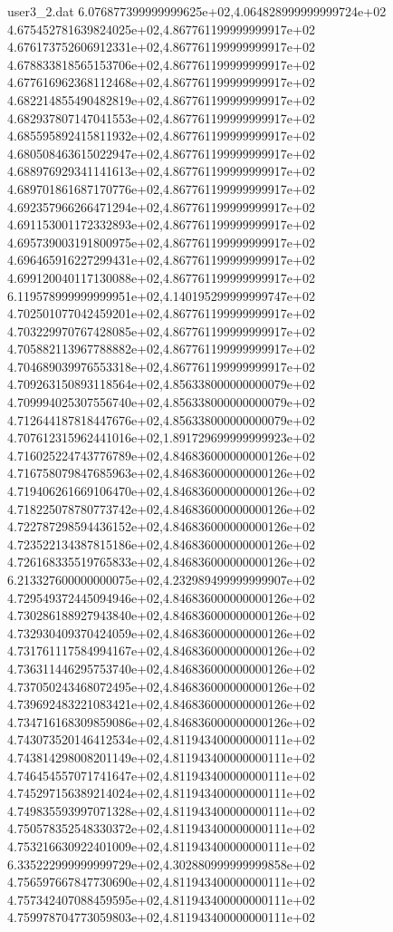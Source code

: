 \begin{filecontents}{user3_2.dat}
6.076877399999999625e+02,4.064828999999999724e+02
4.675452781639824025e+02,4.867761199999999917e+02
4.676173752606912331e+02,4.867761199999999917e+02
4.678833818565153706e+02,4.867761199999999917e+02
4.677616962368112468e+02,4.867761199999999917e+02
4.682214855490482819e+02,4.867761199999999917e+02
4.682937807147041553e+02,4.867761199999999917e+02
4.685595892415811932e+02,4.867761199999999917e+02
4.680508463615022947e+02,4.867761199999999917e+02
4.688976929341141613e+02,4.867761199999999917e+02
4.689701861687170776e+02,4.867761199999999917e+02
4.692357966266471294e+02,4.867761199999999917e+02
4.691153001172332893e+02,4.867761199999999917e+02
4.695739003191800975e+02,4.867761199999999917e+02
4.696465916227299431e+02,4.867761199999999917e+02
4.699120040117130088e+02,4.867761199999999917e+02
6.119578999999999951e+02,4.140195299999999747e+02
4.702501077042459201e+02,4.867761199999999917e+02
4.703229970767428085e+02,4.867761199999999917e+02
4.705882113967788882e+02,4.867761199999999917e+02
4.704689039976553318e+02,4.867761199999999917e+02
4.709263150893118564e+02,4.856338000000000079e+02
4.709994025307556740e+02,4.856338000000000079e+02
4.712644187818447676e+02,4.856338000000000079e+02
4.707612315962441016e+02,1.891729699999999923e+02
4.716025224743776789e+02,4.846836000000000126e+02
4.716758079847685963e+02,4.846836000000000126e+02
4.719406261669106470e+02,4.846836000000000126e+02
4.718225078780773742e+02,4.846836000000000126e+02
4.722787298594436152e+02,4.846836000000000126e+02
4.723522134387815186e+02,4.846836000000000126e+02
4.726168335519765833e+02,4.846836000000000126e+02
6.213327600000000075e+02,4.232989499999999907e+02
4.729549372445094946e+02,4.846836000000000126e+02
4.730286188927943840e+02,4.846836000000000126e+02
4.732930409370424059e+02,4.846836000000000126e+02
4.731761117584994167e+02,4.846836000000000126e+02
4.736311446295753740e+02,4.846836000000000126e+02
4.737050243468072495e+02,4.846836000000000126e+02
4.739692483221083421e+02,4.846836000000000126e+02
4.734716168309859086e+02,4.846836000000000126e+02
4.743073520146412534e+02,4.811943400000000111e+02
4.743814298008201149e+02,4.811943400000000111e+02
4.746454557071741647e+02,4.811943400000000111e+02
4.745297156389214024e+02,4.811943400000000111e+02
4.749835593997071328e+02,4.811943400000000111e+02
4.750578352548330372e+02,4.811943400000000111e+02
4.753216630922401009e+02,4.811943400000000111e+02
6.335222999999999729e+02,4.302880999999999858e+02
4.756597667847730690e+02,4.811943400000000111e+02
4.757342407088459595e+02,4.811943400000000111e+02
4.759978704773059803e+02,4.811943400000000111e+02

\end{filecontents}

